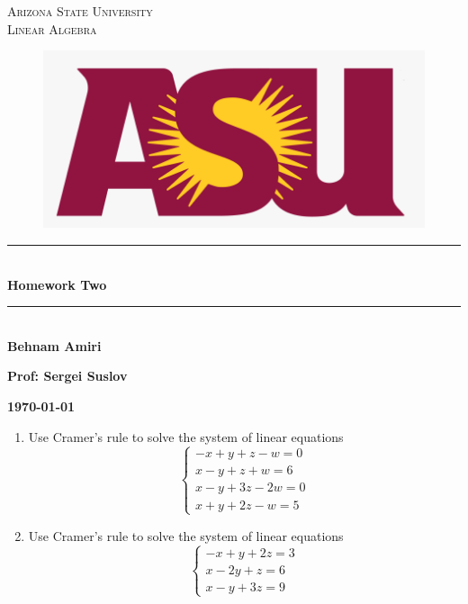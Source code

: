 \documentclass[fleqn]{article}
\begin{document}
  \begin{titlepage}

    \newcommand{\HRule}{\rule{\linewidth}{0.5mm}}

    \center


    \textsc{\LARGE Arizona State University}\\[1.5cm]

    \textsc{\LARGE Linear Algebra }\\[1.5cm]


    \begin{figure}
      \includegraphics[width=\linewidth]{asu.png}
    \end{figure}


    \HRule \\[0.4cm]
    { \huge \bfseries Homework Two}\\[0.4cm] 
    \HRule \\[1.5cm]

    \textbf{Behnam Amiri}

    \bigbreak

    \textbf{Prof: Sergei Suslov}

    \bigbreak


    \textbf{{\large \today}\\[2cm]}

    \vfill

  \end{titlepage}

  \begin{enumerate}
    \item Use Cramer's rule to solve the system of linear equations 
      $$
      \begin{cases}
        -x+y+z-w=0
        \\
        x-y+z+w=6
        \\
        x-y+3z-2w=0
        \\
        x+y+2z-w=5
      \end{cases}
      $$ 

    \item Use Cramer's rule to solve the system of linear equations
      $$
        \begin{cases}
          -x+y+2z=3
          \\
          x-2y+z=6
          \\
          x-y+3z=9
        \end{cases}
      $$

  \end{enumerate}
\end{document}
